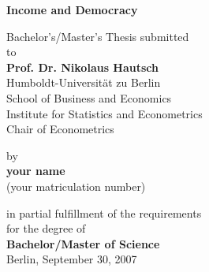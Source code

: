 \begin{center}

    {\Large{\bf Income and Democracy}} \vspace{0.5cm}


    {\normalsize Bachelor's/Master's Thesis submitted\\\vspace{0.5cm}
    to}\\\vspace{0.5cm}
    {\normalsize{\bf Prof. Dr. Nikolaus Hautsch}} \\\vspace{0.5cm}
    {\normalsize Humboldt-Universit\"at zu Berlin \\
    School of Business and Economics \\
    Institute for Statistics and Econometrics \\
    Chair of Econometrics} \vspace{1cm}


    {\normalsize by \\\vspace{0.5cm}
    {\bf your name} \\
    (your matriculation number)} \vspace{1cm}


    {\normalsize in partial fulfillment of the requirements \\
    for the degree of \\
    {\bf Bachelor/Master of Science} \\
    Berlin, September 30, 2007}

\end{center}
